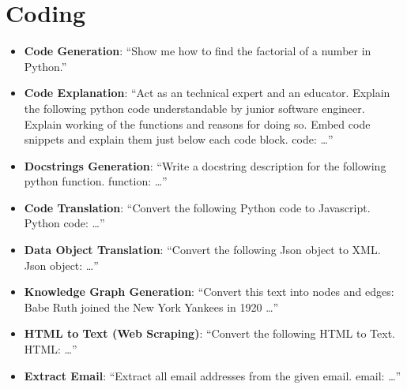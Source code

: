 \section{Coding}
\begin{itemize}
\itemsep-0.25em %
\item \textbf{Code Generation}: ``Show me how to find the factorial of a number in Python.''
\item \textbf{Code Explanation}: ``Act as an technical expert and an educator. Explain the following python code understandable by junior software engineer. Explain working of the functions and reasons for doing so. Embed code snippets and explain them just below each code block. code: \ldots''
\item \textbf{Docstrings Generation}: ``Write a docstring description for the following python function. function: \ldots''
\item \textbf{Code Translation}: ``Convert the following Python code to Javascript. Python code: \ldots''
\item \textbf{Data Object Translation}: ``Convert the following Json object to XML. Json object: \ldots''
\item \textbf{Knowledge Graph Generation}: ``Convert this text into nodes and edges: Babe Ruth joined the New York Yankees in 1920 \ldots''
\item \textbf{HTML to Text (Web Scraping)}: ``Convert the following HTML to Text. HTML: \ldots''
\item \textbf{Extract Email}: ``Extract all email addresses from the given email. email: \ldots''

\end{itemize}

